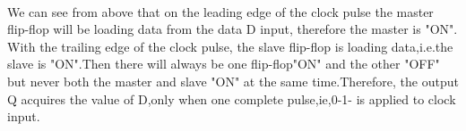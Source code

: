 \documentclass{article}
\begin{document}
  \paragraph{}
  We can see from above that on the leading edge of the clock pulse the master flip-flop will be loading data from the data D input, therefore the master is "ON". With the trailing edge of the clock pulse, the slave flip-flop is loading data,i.e.the slave is "ON".Then there will always be one flip-flop"ON" and the other "OFF" but never both the master and slave "ON" at the same time.Therefore, the output Q acquires the value of D,only when one complete pulse,ie,0-1- is applied to clock input.
\end{document}
